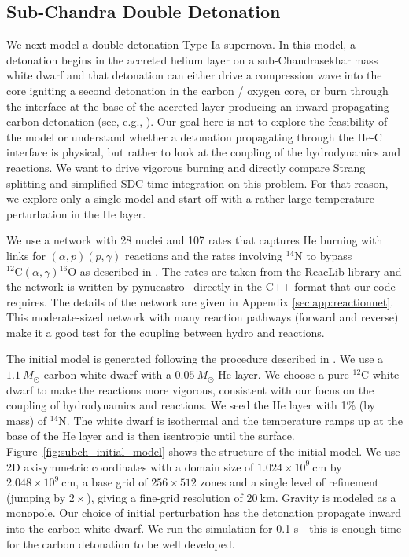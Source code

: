\documentclass[linenumbers]{aastex631}
\newcommand{\pynucastro}{{\sf pynucastro}}
\newcommand{\isot}[2]{$^{#2}\mathrm{#1}$}
\newcommand{\isotm}[2]{{}^{#2}\mathrm{#1}}
\newcommand{\MarginPar}[1]{\marginpar{\vskip-\baselineskip\raggedright\tiny\sffamily\hrule\smallskip{\color{red}#1}\par\smallskip\hrule}}
\begin{document}
\subsection{Sub-Chandra Double Detonation}
\label{sec:dd}

We next model a double detonation Type Ia supernova.  In this model, a
detonation begins in the accreted helium layer on a sub-Chandrasekhar mass white
dwarf and that detonation can either drive a compression wave into the core
igniting a second detonation in the carbon / oxygen core, or burn through the
interface at the base of the accreted layer producing an inward propagating
carbon detonation (see, e.g., \citealt{fink:2007}).  Our goal here is not to
explore the feasibility of the model or understand whether a detonation
propagating through the He-C interface is physical, but rather to look at the
coupling of the hydrodynamics and reactions.  We want to drive vigorous burning
and directly compare Strang splitting and simplified-SDC time integration on this problem.
For that reason, we explore only a single model and start off with a rather
large temperature perturbation in the He layer.

We use a network with 28 nuclei and 107 rates that captures He burning with
links for $(\alpha,p)(p,\gamma)$ reactions and the rates involving \isot{N}{14}
to bypass $\isotm{C}{12}(\alpha,\gamma)\isotm{O}{16}$ as described in
\cite{shenbildsten}.  The rates are taken from the ReacLib library
\citep{reaclib} and the network is written by \pynucastro~\citep{pynucastro}
directly in the C++ format that our code requires.  The details of the network
are given in Appendix \ref{sec:app:reactionnet}. This moderate-sized network
with many reaction pathways (forward and reverse) make it a good test for the
coupling between hydro and reactions.


The initial model is generated following the procedure described in
\citep{subchandra}.  We use a $1.1~M_\odot$ carbon white dwarf with a
$0.05~M_\odot$ He layer.  We choose a pure \isot{C}{12} white dwarf to make the reactions more vigorous, consistent with our focus on the coupling of hydrodynamics and reactions.  We seed the He layer with 1\% (by mass) of
\isot{N}{14}.  The white dwarf is isothermal and the temperature ramps
up at the base of the He layer and is then isentropic until the
surface.  Figure~\ref{fig:subch_initial_model} shows the structure of
the initial model.  We use 2D axisymmetric coordinates with a domain
size of $1.024\times 10^9~\mathrm{cm}$ by $2.048\times
10^9~\mathrm{cm}$, a base grid of $256 \times 512$ zones and a single
level of refinement (jumping by $2\times$), giving a fine-grid
resolution of $20~\mathrm{km}$.  Gravity is modeled as a monopole.
Our choice of initial perturbation has the detonation propagate inward
into the carbon white dwarf.  We run the simulation for 0.1 s---this
is enough time for the carbon detonation to be well developed.
\end{document}

